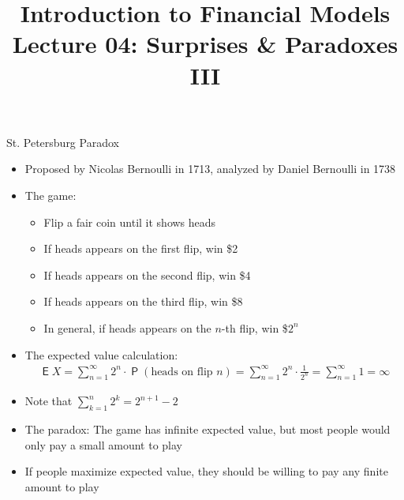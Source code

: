 \documentclass[10pt]{beamer}
\title{Introduction to Financial Models \\ Lecture 04: Surprises \& Paradoxes III}
\author{}
\date{}
\DeclareMathOperator\prb{\mathsf{P}}
\DeclareMathOperator\expc{\mathsf{E}}
\begin{document}
\begin{frame}
\titlepage
\end{frame}


\begin{frame}{St. Petersburg Paradox}
  \begin{itemize}[<+->]
    \item Proposed by Nicolas Bernoulli in 1713, analyzed by Daniel Bernoulli in 1738
    \item The game:
      \begin{itemize}
        \item Flip a fair coin until it shows heads
        \item If heads appears on the first flip, win \$2
        \item If heads appears on the second flip, win \$4
        \item If heads appears on the third flip, win \$8
        \item In general, if heads appears on the $n$-th flip, win \$$2^n$
      \end{itemize}
    \item The expected value calculation:
      \begin{align*}
        \expc{X} = \sum_{n=1}^{\infty} 2^n \cdot \prb(\text{heads on flip } n) = \sum_{n=1}^{\infty} 2^n \cdot \frac{1}{2^n} = \sum_{n=1}^{\infty} 1 = \infty
      \end{align*}
    \item Note that $\sum_{k=1}^n 2^k = 2^{n + 1} - 2$
    \item The paradox: The game has infinite expected value, but most people would only pay a small amount to play
    \item If people maximize expected value, they should be willing to pay any finite amount to play
  \end{itemize}
\end{frame}
\end{document}
